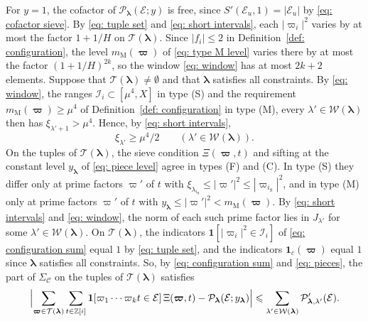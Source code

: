 \documentclass{article}
\numberwithin{equation}{section}
\newcommand{\Le}{\leqslant}
\newcommand{\Ge}{\geqslant}
\begin{document}
For $y = 1$, the cofactor of $\mathcal{P}_{\boldsymbol{\lambda}}(\mathcal{E}; y)$ is free, since $S'(\mathcal{E}_u, 1) = |\mathcal{E}_u|$ by \eqref{eq: cofactor sieve}. By \eqref{eq: tuple set} and \eqref{eq: short intervals}, each $|\varpi_i|^2$ varies by at most the factor $1 + 1/H$ on $\mathcal{T}(\boldsymbol{\lambda})$. Since $|f_i| \Le 2$ in Definition~\ref{def: configuration}, the level $m_{\mathrm{M}}(\boldsymbol{\varpi})$ of \eqref{eq: type M level} varies there by at most the factor $(1 + 1/H)^{2k}$, so the window \eqref{eq: window} has at most $2k + 2$ elements. Suppose that $\mathcal{T}(\boldsymbol{\lambda}) \neq \emptyset$ and that $\boldsymbol{\lambda}$ satisfies all constraints. By \eqref{eq: window}, the ranges $\mathcal{I}_i \subset [\mu^4, X]$ in type (S) and the requirement $m_{\mathrm{M}}(\boldsymbol{\varpi}) \Ge \mu^4$ of Definition~\ref{def: configuration} in type (M), every $\lambda' \in \mathcal{W}(\boldsymbol{\lambda})$ then has $\xi_{\lambda'+1} > \mu^4$. Hence, by \eqref{eq: short intervals},
\begin{equation}
\label{eq: window floor}
\xi_{\lambda'} \Ge \mu^4/2 \qquad (\lambda' \in \mathcal{W}(\boldsymbol{\lambda})).
\end{equation}
On the tuples of $\mathcal{T}(\boldsymbol{\lambda})$, the sieve condition $\Xi(\boldsymbol{\varpi}, t)$ and sifting at the constant level $y_{\boldsymbol{\lambda}}$ of \eqref{eq: piece level} agree in types (F) and (C). In type (S) they differ only at prime factors $\varpi'$ of $t$ with $\xi_{\lambda_{i_{\mathrm{S}}}} \Le |\varpi'|^2 \Le |\varpi_{i_{\mathrm{S}}}|^2$, and in type (M) only at prime factors $\varpi'$ of $t$ with $y_{\boldsymbol{\lambda}} \Le |\varpi'|^2 < m_{\mathrm{M}}(\boldsymbol{\varpi})$. By \eqref{eq: short intervals} and \eqref{eq: window}, the norm of each such prime factor lies in $J_{\lambda'}$ for some $\lambda' \in \mathcal{W}(\boldsymbol{\lambda})$. On $\mathcal{T}(\boldsymbol{\lambda})$, the indicators $\mathbf{1}[|\varpi_i|^2 \in \mathcal{I}_i]$ of \eqref{eq: configuration sum} equal $1$ by \eqref{eq: tuple set}, and the indicators $\mathbf{1}_c(\boldsymbol{\varpi})$ equal $1$ since $\boldsymbol{\lambda}$ satisfies all constraints. So, by \eqref{eq: configuration sum} and \eqref{eq: pieces}, the part of $\Sigma_{\mathcal{C}}$ on the tuples of $\mathcal{T}(\boldsymbol{\lambda})$ satisfies
\begin{equation*}
\Bigl| \sum_{\boldsymbol{\varpi} \in \mathcal{T}(\boldsymbol{\lambda})} \sum_{t \in \mathbb{Z}[i]} \mathbf{1}[\varpi_1 \cdots \varpi_k t \in \mathcal{E}]\, \Xi(\boldsymbol{\varpi}, t) - \mathcal{P}_{\boldsymbol{\lambda}}(\mathcal{E}; y_{\boldsymbol{\lambda}}) \Bigr| \Le \sum_{\lambda' \in \mathcal{W}(\boldsymbol{\lambda})} \mathcal{P}'_{\boldsymbol{\lambda},\lambda'}(\mathcal{E}).
\end{equation*}
\end{document}
